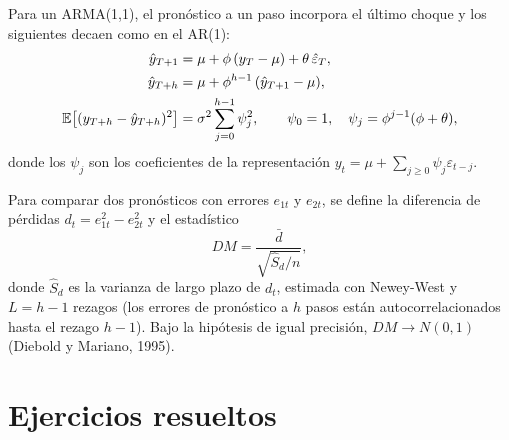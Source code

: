 Para un ARMA(1,1), el pronóstico a un paso incorpora el último choque y los siguientes decaen como en el AR(1):
\begin{align*}
  \hat y_{T+1} &= \mu+\phi\,(y_T-\mu)+\theta\,\hat\varepsilon_T,\\
  \hat y_{T+h} &= \mu+\phi^{h-1}\,(\hat y_{T+1}-\mu),\\
  \mathbb{E}\bigl[(y_{T+h}-\hat y_{T+h})^2\bigr] &= \sigma^2\sum_{j=0}^{h-1}\psi_j^2,\qquad \psi_0=1,\quad \psi_j=\phi^{j-1}(\phi+\theta),
\end{align*}
donde los $\psi_j$ son los coeficientes de la representación $y_t=\mu+\sum_{j\ge0}\psi_j\varepsilon_{t-j}$.

\begin{definicion}
Para comparar dos pronósticos con errores $e_{1t}$ y $e_{2t}$, se define la diferencia de pérdidas
$d_t=e_{1t}^2-e_{2t}^2$ y el estadístico
\[
  DM=\frac{\bar d}{\sqrt{\hat S_d/n}},
\]
donde $\hat S_d$ es la varianza de largo plazo de $d_t$, estimada con Newey-West y $L=h-1$ rezagos (los errores
de pronóstico a $h$ pasos están autocorrelacionados hasta el rezago $h-1$). Bajo la hipótesis de igual
precisión, $DM\to N(0,1)$ (Diebold y Mariano, 1995).
\end{definicion}

\section{Ejercicios resueltos}

